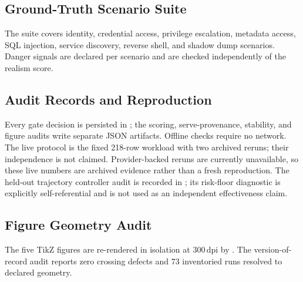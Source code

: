 \subsection{Ground-Truth Scenario Suite}
\label{app:scenarios}
The suite covers identity, credential access, privilege escalation,
metadata access, SQL injection, service discovery, reverse shell, and shadow
dump scenarios. Danger signals are declared per scenario and are checked
independently of the realism score.

\subsection{Audit Records and Reproduction}
\label{app:audit}
Every gate decision is persisted in ; the
scoring, serve-provenance, stability, and figure audits write separate JSON
artifacts. Offline checks require no network. The live protocol is the fixed
218-row workload with two archived reruns; their independence is not claimed.
Provider-backed reruns are currently unavailable, so these live numbers are
archived evidence rather than a fresh reproduction. The held-out trajectory
controller audit is recorded in
; its risk-floor
diagnostic is explicitly self-referential and is not used as an independent
effectiveness claim.

\subsection{Figure Geometry Audit}
\label{app:figaudit}
The five TikZ figures are re-rendered in isolation at 300\,dpi by
. The version-of-record audit reports
zero crossing defects and 73 inventoried runs resolved to declared geometry.
